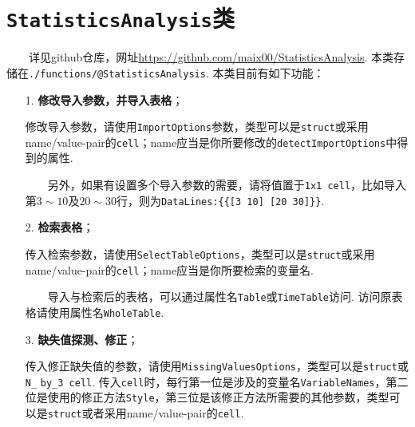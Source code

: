 \documentclass[a4paper, titlepage]{article}
\begin{document}
    \section{\texttt{StatisticsAnalysis}类}\label{app:StatisticsAnalysis}
    　　详见github仓库，网址\url{https://github.com/maix00/StatisticsAnalysis}. 本类存储在\texttt{./functions/@StatisticsAnalysis}. 本类目前有如下功能：
    \begin{enumerate}
        \item [1.] \textbf{修改导入参数，并导入表格}；
        
        {\kaishu 
        修改导入参数，请使用\texttt{ImportOptions}参数，类型可以是\texttt{struct}或采用name/value-pair的\texttt{cell}；name应当是你所要修改的\texttt{detectImportOptions}中得到的属性. 
        
        　　另外，如果有设置多个导入参数的需要，请将值置于\texttt{1x1 cell}，比如导入第$3\sim 10$及$20\sim 30$行，则为\texttt{DataLines:\{\{[3 10] [20 30]\}\}}.
        }
        \item [2.] \textbf{检索表格}；
        
        {\kaishu
        传入检索参数，请使用\texttt{SelectTableOptions}，类型可以是\texttt{struct}或采用name/value-pair的\texttt{cell}；name应当是你所要检索的变量名.

        　　导入与检索后的表格，可以通过属性名\texttt{Table}或\texttt{TimeTable}访问. 访问原表格请使用属性名\texttt{WholeTable}. 
        }
        \item [3.] \textbf{缺失值探测、修正}；
        
        {\kaishu
        传入修正缺失值的参数，请使用\texttt{MissingValuesOptions}，类型可以是\texttt{struct}或\texttt{N\_} \texttt{by\_3 cell}. 传入\texttt{cell}时，每行第一位是涉及的变量名\texttt{VariableNames}，第二位是使用的修正方法\texttt{Style}，第三位是该修正方法所需要的其他参数，类型可以是\texttt{struct}或者采用name/value-pair的\texttt{cell}.

}
\end{enumerate}
\end{document}
